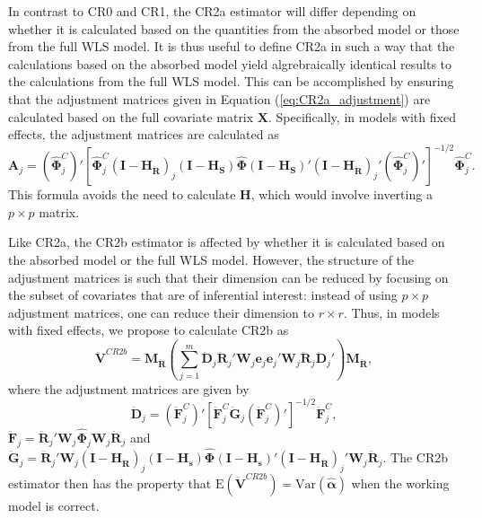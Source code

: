 \documentclass[12pt]{article}\usepackage[]{graphicx}\usepackage[]{color}
\newcommand{\E}{\text{E}}
\newcommand{\Var}{\text{Var}}
\newcommand{\bm}{\mathbf}
\newcommand{\bs}{\boldsymbol}
\begin{document}
In contrast to CR0 and CR1, the CR2a estimator will differ depending on whether it is calculated based on the quantities from the absorbed model or those from the full WLS model. 
It is thus useful to define CR2a in such a way that the calculations based on the absorbed model yield algrebraically identical results to the calculations from the full WLS model. 
This can be accomplished by ensuring that the adjustment matrices given in Equation (\ref{eq:CR2a_adjustment}) are calculated based on the full covariate matrix $\bm{X}$. Specifically, in models with fixed effects, the adjustment matrices are calculated as 
\begin{equation}
\label{eq:CR2_panel_adjustment}
\bm{A}_j = \left(\hat{\bs\Phi}_j^C\right)' \left[\hat{\bs\Phi}_j^C\left(\bm{I} - \bm{H_{\ddot{R}}}\right)_j \left(\bm{I} - \bm{H_S}\right) \hat{\bs\Phi} \left(\bm{I} - \bm{H_S}\right)' \left(\bm{I} - \bm{H_{\ddot{R}}}\right)_j' \left(\hat{\bs\Phi}_j^C\right)' \right]^{-1/2}\hat{\bs\Phi}_j^C.
\end{equation}
This formula avoids the need to calculate $\bm{H}$, which would involve inverting a $p \times p$ matrix.

Like CR2a, the CR2b estimator is affected by whether it is calculated based on the absorbed model or the full WLS model. However, the structure of the adjustment matrices is such that their dimension can be reduced by focusing on the subset of covariates that are of inferential interest: instead of using $p \times p$ adjustment matrices, one can reduce their dimension to $r \times r$. Thus, in models with fixed effects, we propose to calculate CR2b as 
\begin{equation}
\label{eq:V_CR2b_FE}
\bm{\ddot{V}}^{CR2b} = \bm{M_{\ddot{R}}} \left(\sum_{j=1}^m \bm{\ddot{D}}_j \bm{\ddot{R}}_j' \bm{W}_j \bm{e}_j \bm{e}_j' \bm{W}_j \bm{\ddot{R}}_j \bm{\ddot{D}}_j'\right) \bm{M_{\ddot{R}}},
\end{equation}
where the adjustment matrices are given by 
\begin{equation}
\bm{\ddot{D}}_j = \left(\bm{\ddot{F}}_j^C\right)'\left[\bm{\ddot{F}}_j^C \bm{\ddot{G}}_j \left(\bm{\ddot{F}}_j^C\right)'\right]^{-1/2}\bm{\ddot{F}}_j^C,
\end{equation}
$\bm{\ddot{F}}_j = \bm{\ddot{R}}_j' \bm{W}_j \hat{\bs\Phi}_j \bm{W}_j \bm{\ddot{R}}_j$ and $\bm{\ddot{G}}_j = \bm{\ddot{R}}_j' \bm{W}_j \left(\bm{I} - \bm{H_{\ddot{R}}}\right)_j  \left(\bm{I} - \bm{H_s}\right) \hat{\bs\Phi} \left(\bm{I} - \bm{H_s}\right)' \left(\bm{I} - \bm{H_{\ddot{R}}}\right)_j' \bm{W}_j \bm{\ddot{R}}_j$. The CR2b estimator then has the property that $\E\left(\bm{\ddot{V}}^{CR2b}\right) = \Var\left(\bs{\hat\alpha}\right)$ when the working model is correct.
\end{document}
